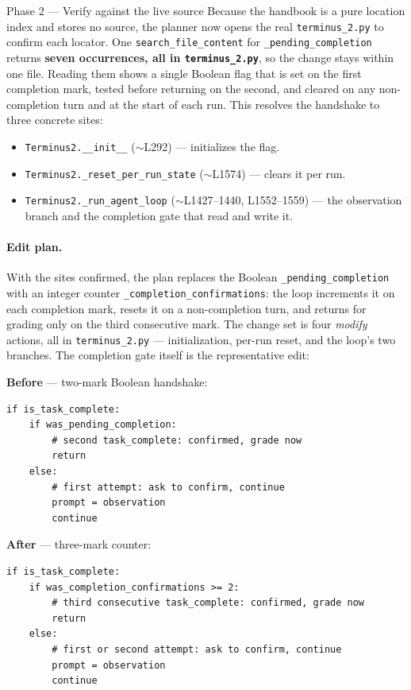 \documentclass[]{ailab}
\newcommand{\code}[1]{\texttt{#1}}
\begin{document}
\begin{casebox}{Phase 2 --- Verify against the live source}
Because the handbook is a pure location index and stores no source, the planner
now opens the real \code{terminus\_2.py} to confirm each locator. One
\code{search\_file\_content} for \code{\_pending\_completion} returns \textbf{seven
occurrences, all in \code{terminus\_2.py}}, so the change stays within one file.
Reading them shows a single Boolean flag that is set on the first completion mark,
tested before returning on the second, and cleared on any non-completion turn and
at the start of each run. This resolves the handshake to three concrete sites:
\begin{itemize}[leftmargin=1.4em,itemsep=1pt,topsep=2pt]
  \item \code{Terminus2.\_\_init\_\_} ($\sim$L292) --- initializes the flag.
  \item \code{Terminus2.\_reset\_per\_run\_state} ($\sim$L1574) --- clears it per run.
  \item \code{Terminus2.\_run\_agent\_loop} ($\sim$L1427--1440, L1552--1559) ---
  the observation branch and the completion gate that read and write it.
\end{itemize}
\end{casebox}

\paragraph{Edit plan.}
With the sites confirmed, the plan replaces the Boolean \code{\_pending\_completion}
with an integer counter \code{\_completion\_confirmations}: the loop increments it
on each completion mark, resets it on a non-completion turn, and returns for
grading only on the third consecutive mark. The change set is four \emph{modify}
actions, all in \code{terminus\_2.py} --- initialization, per-run reset, and the
loop's two branches. The completion gate itself is the representative edit:

\noindent\textbf{Before} --- two-mark Boolean handshake:
\begin{lstlisting}[style=codesnip]
if is_task_complete:
    if was_pending_completion:
        # second task_complete: confirmed, grade now
        return
    else:
        # first attempt: ask to confirm, continue
        prompt = observation
        continue
\end{lstlisting}
\noindent\textbf{After} --- three-mark counter:
\begin{lstlisting}[style=codesnip]
if is_task_complete:
    if was_completion_confirmations >= 2:
        # third consecutive task_complete: confirmed, grade now
        return
    else:
        # first or second attempt: ask to confirm, continue
        prompt = observation
        continue
\end{lstlisting}
\end{document}
